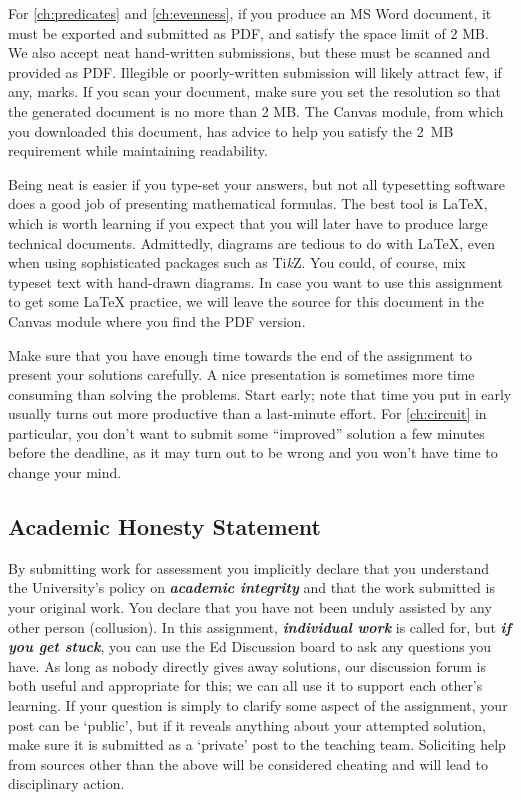 \documentclass[11pt]{article}
\newcounter{challenge}
\newcommand{\pdfchallenges}[0]{\ref{ch:predicates} and \ref{ch:evenness}}
\begin{document}
For \pdfchallenges, if you produce an MS Word document, 
it must be exported and submitted as PDF, and satisfy the space limit of 2 MB. 
We also accept neat hand-written submissions, but these must be scanned and provided as PDF. 
Illegible or poorly-written submission will likely attract few, if any, marks.
If you scan your document, make sure you set the resolution so that the generated document 
is no more than 2 MB. The Canvas module, from which you downloaded this document, 
has advice to help you satisfy the 2~MB requirement while maintaining readability.

Being neat is easier if you type-set your answers, but not all typesetting software does a good
job of presenting mathematical formulas. The best tool is \LaTeX{}, which is worth learning if you
expect that you will later have to produce large technical documents. Admittedly, diagrams are
tedious to do with \LaTeX{}, even when using sophisticated packages such as Ti\textit{k}Z. You could, of
course, mix typeset text with hand-drawn diagrams. In case you want to use this assignment to
get some \LaTeX{} practice, we will leave the source for this document in the Canvas module where
you find the PDF version.

Make sure that you have enough time towards the end of the assignment to present your solutions
carefully. A nice presentation is sometimes more time consuming than solving the problems. Start
early; note that time you put in early usually turns out more productive than a last-minute effort.
For \ref{ch:circuit} in particular, you don’t want to submit some ``improved'' solution a few minutes
before the deadline, as it may turn out to be wrong and you won’t have time to change your mind.

\subsection*{Academic Honesty Statement}

By submitting work for assessment you implicitly declare that you 
understand the University’s policy on \textit{\textbf{academic integrity}} 
and that the work submitted is your original work. 
You declare that you have not been unduly assisted by any other person 
(collusion). 
In this assignment, \textit{\textbf{individual work}} is called for, 
but \textit{\textbf{if you get stuck}}, you can use the Ed Discussion 
board to ask any questions you have. 
As long as nobody directly gives away solutions, 
our discussion forum is both useful and appropriate for this; 
we can all use it to support each other's learning. 
If your question is simply to clarify some aspect of the assignment, 
your post can be `public', but if it reveals anything about your 
attempted solution, make sure it is submitted as a `private' post 
to the teaching team. 
Soliciting help from sources other than the above will be considered 
cheating and will lead to disciplinary action.
\end{document}
